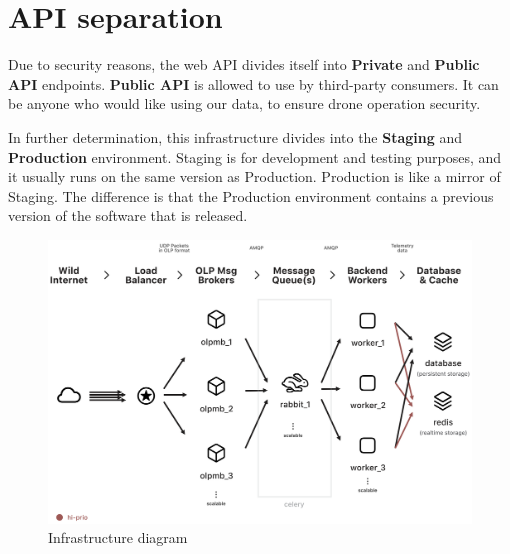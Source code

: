 \section{API separation}\label{sec:api-separation}
Due to security reasons, the web API divides itself into \textbf{Private} and \textbf{Public API} endpoints.
\textbf{Public API} is allowed to use by third-party consumers.
It can be anyone who would like using our data, to ensure drone operation security.

In further determination, this infrastructure divides into the \textbf{Staging} and \textbf{Production} environment.
Staging is for development and testing purposes, and it usually runs on the same version as Production.
Production is like a mirror of Staging.
The difference is that the Production environment contains a previous version of the software that is released.













\begin{figure}
    \centering
    \includegraphics[scale=0.29, angle=90]{assets/infrastructure-diagram.png}
    \caption{Infrastructure diagram~\cite{dataInfrastructure}}
    \label{fig:infrastracture-diagram}
\end{figure}
